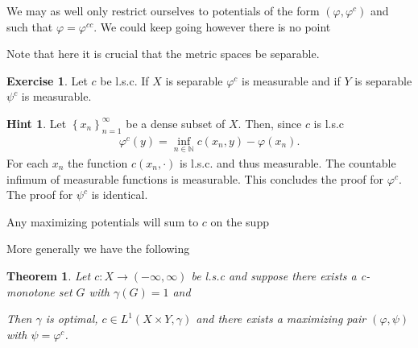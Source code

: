 \documentclass[
    a4paper,
    DIV=14,
    abstract=true,
    numbers=noenddot
]
{scrartcl}
\newtheorem{theorem}{Theorem}[section]
\theoremstyle{definition}
\newtheorem{exercise}{Exercise}
\newtheorem*{hint}{Hint}
\newcommand{\set}[1]{\left\{#1\right\}}
\newcommand{\N}{\mathbb{N}}
\begin{document}
We may as well only restrict ourselves to potentials of the form $(\varphi , \varphi ^c)$ and such that $\varphi = \varphi ^{cc}$. We could keep going however there is no point

Note that here it is crucial that the metric spaces be separable.
\begin{exercise}
    Let $c$ be l.s.c. If $X$ is separable $\varphi ^c$ is measurable and if $Y$ is separable $\psi ^c$ is measurable.
\end{exercise}
\begin{hint}
    Let $\set{x_n}_{n=1}^\infty$ be a dense subset of $X$. Then, since $c$ is l.s.c
    \begin{align*}
        \varphi ^c(y)= \inf_{n \in \N} c(x_n,y) - \varphi (x_n).
    \end{align*}
    For each $x_n$ the function  $c(x_n,\cdot )$ is l.s.c. and thus measurable. The countable infimum of measurable functions is measurable. This concludes the proof for $\varphi^c $. The proof for $\psi^c$ is identical.
\end{hint}
Any maximizing potentials will sum to $c$ on the supp



More generally we have the following
\begin{theorem}
    Let $c:X \to (- \infty, \infty)$ be l.s.c and suppose there exists a c-monotone set $G$  with $\gamma(G)=1$     and

    Then $\gamma $ is optimal, $c \in L^1(X\times Y, \gamma )$ and there exists a maximizing pair $(\varphi ,\psi )$ with $\psi = \varphi ^c$.
\end{theorem}

\appendix
\end{document}
